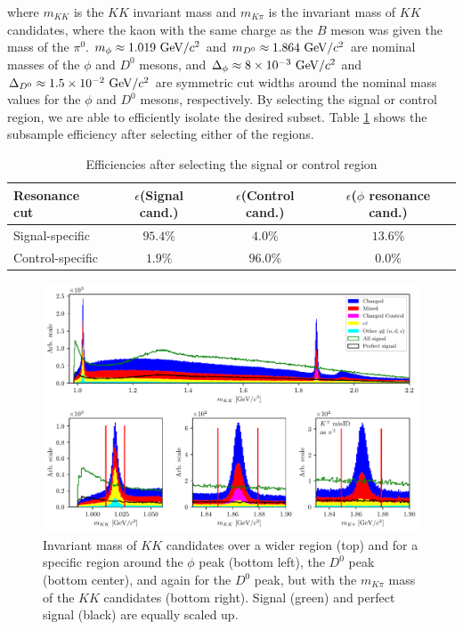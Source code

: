 where $m_{KK}$ is the $KK$ invariant mass and $m_{K\pi}$ is the invariant mass of $KK$ candidates, where the kaon with the same charge as the $B$ meson was given the mass of the $\pi^0$. $m_\phi \approx 1.019\mathrm{~GeV}/c^2$ and $m_{D^0} \approx 1.864\mathrm{~GeV}/c^2$ are nominal masses of the $\phi$ and $D^0$ mesons, and $\Delta_\phi \approx 8\times 10^{-3}\mathrm{~GeV}/c^2$ and $\Delta_{D^0} \approx 1.5\times 10^{-2}\mathrm{~GeV}/c^2$ are symmetric cut widths around the nominal mass values for the $\phi$ and $D^0$ mesons, respectively. By selecting the signal or control region, we are able to efficiently isolate the desired subset. Table \ref{tab:cut_eff} shows the subsample efficiency after selecting either of the regions.

\begin{table}[H]
	\centering
	\begin{tabular}{l|c|c|c}
		Resonance cut & $\epsilon$(Signal cand.)& $\epsilon$(Control cand.) & $\epsilon$($\phi$ resonance cand.)\\
		\toprule
		Signal-specific & $95.4\%$ & $4.0\%$ & $13.6\%$ \\
		Control-specific & $1.9\%$ & $96.0\%$ & $0.0\%$ \\
		\bottomrule
	\end{tabular}
	\caption{Efficiencies after selecting the signal or control region}
	\label{tab:cut_eff}
\end{table}


\begin{figure}[H]
	\centering
	\captionsetup{width=0.8\linewidth}
	\includegraphics[width=\linewidth]{fig/res_bkg}
	\caption{Invariant mass of $KK$ candidates over a wider region (top) and for a specific region around the $\phi$ peak (bottom left), the $D^0$ peak (bottom center), and again for the $D^0$ peak, but with the $m_{K\pi}$ mass of the $KK$ candidates (bottom right). Signal (green) and perfect signal (black) are equally scaled up.}
	\label{fig:res_bkg}
\end{figure}


